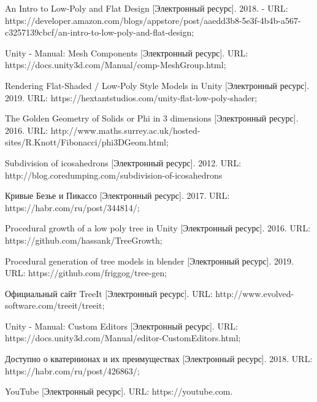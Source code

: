 \documentclass[a4paper,14pt,oneside]{extreport}
\begin{document}
    
    
    
    
    \tableofcontents
    \newpage

    
    
    
    
    
    
    
    \renewcommand\bibname{Список использованных источников}
    
    \begin{thebibliography}{3}
    
    An Intro to Low-Poly and Flat Design [Электронный ресурс]. 2018. - URL: https://developer.amazon.com/blogs/appstore/post/aaedd3b8-5e3f-4b4b-a567-c3257139cbcf/an-intro-to-low-poly-and-flat-design;
    
    Unity - Manual: Mesh Components [Электронный ресурс]. URL: https://docs.unity3d.com/Manual/comp-MeshGroup.html;
    
    Rendering Flat-Shaded / Low-Poly Style Models in Unity [Электронный ресурс]. 2019. URL: https://hextantstudios.com/unity-flat-low-poly-shader;
    
    The Golden Geometry of Solids or Phi in 3 dimensions [Электронный ресурс]. 2016. URL: http://www.maths.surrey.ac.uk/hosted-sites/R.Knott/Fibonacci/phi3DGeom.html;
    
    Subdivision of icosahedrons [Электронный ресурс]. 2012. URL: http://blog.coredumping.com/subdivision-of-icosahedrons
    
    Кривые Безье и Пикассо [Электронный ресурс]. 2017. URL: https://habr.com/ru/post/344814/;
    
    Procedural growth of a low poly tree in Unity [Электронный ресурс]. 2016. URL: https://github.com/hassank/TreeGrowth;
    
    Procedural generation of tree models in blender [Электронный ресурс]. 2019. URL: https://github.com/friggog/tree-gen;
    
    Официальный сайт TreeIt [Электронный ресурс]. URL: http://www.evolved-software.com/treeit/treeit;
    
    Unity - Manual: Custom Editors [Электронный ресурс]. URL: https://docs.unity3d.com/Manual/editor-CustomEditors.html;
    
    Доступно о кватернионах и их преимуществах [Электронный ресурс]. 2018. URL: https://habr.com/ru/post/426863/;
    
    YouTube [Электронный ресурс]. URL: https://youtube.com.
    
    \end{thebibliography}
    
\end{document}
